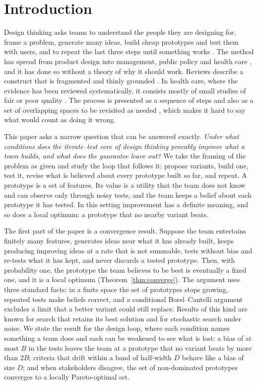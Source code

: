 \documentclass[10pt,twocolumn]{article}
\theoremstyle{definition}
\begin{document}
\section{Introduction}

Design thinking asks teams to understand the people they are designing for, frame a problem, generate many ideas, build cheap prototypes and test them with users, and to repeat the last three steps until something works \citep{dschool2010}. The method has spread from product design into management, public policy and health care \citep{liedtka2015, mintrom2016, altman2018}, and it has done so without a theory of why it should work. Reviews describe a construct that is fragmented and thinly grounded \citep{johansson2013, micheli2019}. In health care, where the evidence has been reviewed systematically, it consists mostly of small studies of fair or poor quality \citep{altman2018}. The process is presented as a sequence of steps and also as a set of overlapping spaces to be revisited as needed \citep{brown2008}, which makes it hard to say what would count as doing it wrong.

This paper asks a narrow question that can be answered exactly. \emph{Under what conditions does the iterate--test core of design thinking provably improve what a team builds, and what does the guarantee leave out?} We take the framing of the problem as given and study the loop that follows it: propose variants, build one, test it, revise what is believed about every prototype built so far, and repeat. A prototype is a set of features. Its value is a utility that the team does not know and can observe only through noisy tests, and the team keeps a belief about each prototype it has tested. In this setting improvement has a definite meaning, and so does a local optimum: a prototype that no nearby variant beats.

The first part of the paper is a convergence result. Suppose the team entertains finitely many features, generates ideas near what it has already built, keeps producing improving ideas at a rate that is not summable, tests without bias and re-tests what it has kept, and never discards a tested prototype. Then, with probability one, the prototype the team believes to be best is eventually a fixed one, and it is a local optimum (Theorem~\ref{thm:converge}). The argument uses three standard facts: in a finite space the set of prototypes stops growing, repeated tests make beliefs correct, and a conditional Borel--Cantelli argument excludes a limit that a better variant could still replace. Results of this kind are known for search that retains its best solution and for stochastic search under noise. We state the result for the design loop, where each condition names something a team does and each can be weakened to see what is lost: a bias of at most $B$ in the tests leaves the team at a prototype that no variant beats by more than $2B$; criteria that drift within a band of half-width $D$ behave like a bias of size $D$; and when stakeholders disagree, the set of non-dominated prototypes converges to a locally Pareto-optimal set.
\end{document}
